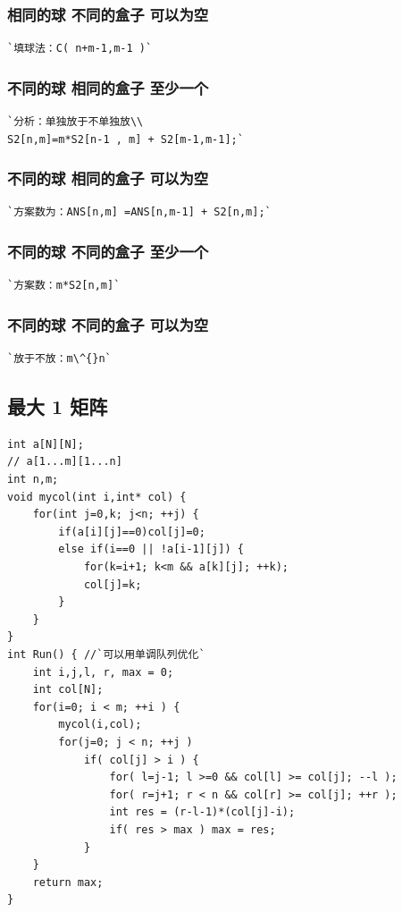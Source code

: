 \documentclass[a4paper]{article}
\begin{document}
\begin{CJK*}{UTF8}{gbsn}
\begin{multicols}{3}
\begin{flushleft}
\subsubsection{相同的球 不同的盒子 可以为空}
\begin{lstlisting}
`填球法：C( n+m-1,m-1 )`
\end{lstlisting}

\subsubsection{不同的球 相同的盒子 至少一个}
\begin{lstlisting}
`分析：单独放于不单独放\\
S2[n,m]=m*S2[n-1 , m] + S2[m-1,m-1];`
\end{lstlisting}

\subsubsection{不同的球 相同的盒子 可以为空}
\begin{lstlisting}
`方案数为：ANS[n,m] =ANS[n,m-1] + S2[n,m];`
\end{lstlisting}

\subsubsection{不同的球 不同的盒子 至少一个}
\begin{lstlisting}
`方案数：m*S2[n,m]`
\end{lstlisting}

\subsubsection{不同的球 不同的盒子 可以为空}
\begin{lstlisting}
`放于不放：m\^{}n`
\end{lstlisting}


\subsection{最大 1 矩阵}
\begin{lstlisting}
int a[N][N];
// a[1...m][1...n]
int n,m;
void mycol(int i,int* col) {
    for(int j=0,k; j<n; ++j) {
        if(a[i][j]==0)col[j]=0;
        else if(i==0 || !a[i-1][j]) {
            for(k=i+1; k<m && a[k][j]; ++k);
            col[j]=k;
        }
    }
}
int Run() { //`可以用单调队列优化`
    int i,j,l, r, max = 0;
    int col[N];
    for(i=0; i < m; ++i ) {
        mycol(i,col);
        for(j=0; j < n; ++j )
            if( col[j] > i ) {
                for( l=j-1; l >=0 && col[l] >= col[j]; --l );
                for( r=j+1; r < n && col[r] >= col[j]; ++r );
                int res = (r-l-1)*(col[j]-i);
                if( res > max ) max = res;
            }
    }
    return max;
}
\end{lstlisting}


\end{flushleft}
\end{multicols}
\end{CJK*}
\end{document}
